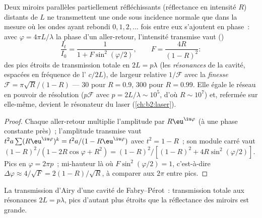 \begin{proposition}\label{prop:b2:gratings:fabryperot}
Deux miroirs parallèles partiellement réfléchissants (réflectance en intensité $R$)
distants de $L$ ne transmettent une onde sous incidence normale que dans la mesure
où les ondes ayant rebondi $0, 1, 2, \dots$ fois entre eux s'ajoutent
en phase~: avec $\varphi = 4\pi L/\lambda$ la phase d'un aller-retour, l'intensité
transmise vaut ()
\[
\frac{I_t}{I_0} = \frac1{1 + F\sin^2(\varphi/2)} , \qquad F = \frac{4R}{(1 - R)^2} :
\]
des pics étroits de transmission totale en $2L = p\lambda$ (les \emph{résonances}
de la cavité, espacées en fréquence de l'\emph{}
$c/2L$), de largeur relative $1/\mathcal F$ avec la \emph{finesse} $\mathcal F = \pi
\sqrt R/(1 - R)$ --- $30$ pour $R = 0.9$, $300$ pour $R = 0.99$. Elle égale le réseau
en pouvoir de résolution ($p\mathcal F$ avec $p = 2L/\lambda \sim 10^5$, d'où $R \sim
10^7$) et, refermée sur elle-même, devient le résonateur du laser
(\cref{ch:b2:laser}).
\end{proposition}

\begin{proof}
Chaque aller-retour multiplie l'amplitude par $R\eu^{\iu\varphi}$ (à une
phase constante près)~; l'amplitude transmise vaut $t^2a\sum(R\eu^{\iu\varphi})^k =
t^2a/(1 - R\eu^{\iu\varphi})$ avec $t^2 = 1 - R$~; son module carré vaut $(1 - R)^2/
(1 - 2R\cos\varphi + R^2) = (1 - R)^2/[(1 - R)^2 + 4R\sin^2(\varphi/2)]$. Pics en
$\varphi = 2\pi p$~; mi-hauteur là où $F\sin^2(\varphi/2) = 1$, c'est-à-dire $\Delta\varphi \approx
4/\sqrt F = 2(1 - R)/\sqrt R$, à comparer aux $2\pi$ entre pics.
\end{proof}

\begin{omfigure}

{\small La transmission d'Airy d'une cavité de Fabry--Pérot~: transmission
totale aux résonances $2L = p\lambda$, pics d'autant plus étroits que la
réflectance des miroirs est grande.}
\end{omfigure}

